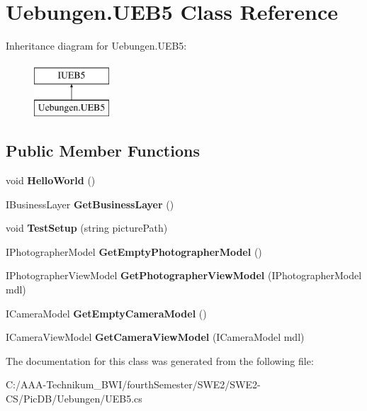 \hypertarget{class_uebungen_1_1_u_e_b5}{}\section{Uebungen.\+U\+E\+B5 Class Reference}
\label{class_uebungen_1_1_u_e_b5}
Inheritance diagram for Uebungen.\+U\+E\+B5\+:\begin{figure}[H]
\begin{center}
\leavevmode
\includegraphics[height=2.000000cm]{class_uebungen_1_1_u_e_b5}
\end{center}
\end{figure}
\subsection*{Public Member Functions}
\begin{DoxyCompactItemize}
\item 
\mbox{\label{class_uebungen_1_1_u_e_b5_a50736f8ad4c37074a9b95449aeb428fc}} 
void {\bfseries Hello\+World} ()
\item 
\mbox{\label{class_uebungen_1_1_u_e_b5_af73add46a8dea4ad9c37b233903040be}} 
I\+Business\+Layer {\bfseries Get\+Business\+Layer} ()
\item 
\mbox{\label{class_uebungen_1_1_u_e_b5_afbc06ece8e870beb85d47b274fd9522a}} 
void {\bfseries Test\+Setup} (string picture\+Path)
\item 
\mbox{\label{class_uebungen_1_1_u_e_b5_ae222b3d96e9d71d0a63abd1742c12f27}} 
I\+Photographer\+Model {\bfseries Get\+Empty\+Photographer\+Model} ()
\item 
\mbox{\label{class_uebungen_1_1_u_e_b5_a7f12cadbe4d16275876d0d6696c1845b}} 
I\+Photographer\+View\+Model {\bfseries Get\+Photographer\+View\+Model} (I\+Photographer\+Model mdl)
\item 
\mbox{\label{class_uebungen_1_1_u_e_b5_a5d0cf31ecec0d3a89d11ae0e63001493}} 
I\+Camera\+Model {\bfseries Get\+Empty\+Camera\+Model} ()
\item 
\mbox{\label{class_uebungen_1_1_u_e_b5_ad5bd75f2a1950889259a097d7770e4a7}} 
I\+Camera\+View\+Model {\bfseries Get\+Camera\+View\+Model} (I\+Camera\+Model mdl)
\end{DoxyCompactItemize}


The documentation for this class was generated from the following file\+:\begin{DoxyCompactItemize}
\item 
C\+:/\+A\+A\+A-\/\+Technikum\+\_\+\+B\+W\+I/fourth\+Semester/\+S\+W\+E2/\+S\+W\+E2-\/\+C\+S/\+Pic\+D\+B/\+Uebungen/U\+E\+B5.\+cs\end{DoxyCompactItemize}

